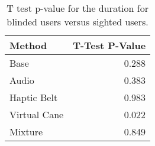 
\begin{table}[!htb]
\centering
\caption{T test p-value for the duration for blinded users versus sighted users.}
\label{tab:ttest_duration}
\begin{tabular}{lr}
\toprule
      Method &  T-Test P-Value \\
\midrule
        Base &           0.288 \\
       Audio &           0.383 \\
 Haptic Belt &           0.983 \\
Virtual Cane &           0.022 \\
     Mixture &           0.849 \\
\bottomrule
\end{tabular}
\end{table}

